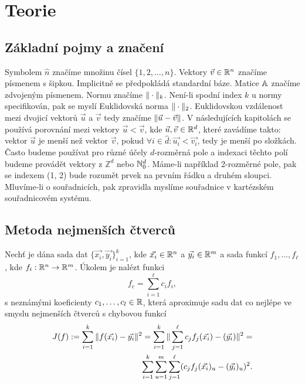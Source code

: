 \chapter{Teorie}

\section{Základní pojmy a značení}

Symbolem $\hat n$ značíme množinu čísel $\{1, 2, \ldots, n\}$. Vektory $\vec{v} \in \mathbb{R}^n$ značíme písmenem s šipkou. Implicitně se předpokládá standardní báze. Matice $\mathbb{A}$ značíme zdvojeným písmenem. Normu značíme $\|\cdot\|_k$. Není-li spodní index $k$ u normy specifikován, pak se myslí Euklidovská norma $\|\cdot\|_2$. Euklidovskou vzdálenost mezi dvojicí vektorů $\vec{u}$ a $\vec{v}$ tedy značíme $\|\vec{u} - \vec{v}\|$. V následujících kapitolách se používá porovnání mezi vektory $\vec{u} < \vec{v}$, kde $\vec{u}, \vec{v} \in \mathbb{R}^d$, které zavádíme takto: vektor $\vec{u}$ je menší než vektor $\vec{v}$, pokud $\forall i \in \hat{d}: \vec{u_i} < \vec{v_i}$, tedy je menší po složkách. Často budeme používat pro různé účely $d$-rozměrná pole a indexaci těchto polí budeme provádět vektory z $\mathbb{Z}^d$ nebo $\mathbb{N}_0^d$. Máme-li například 2-rozměrné pole, pak se indexem (1, 2) bude rozumět prvek na prvním řádku a druhém sloupci. Mluvíme-li o souřadnicích, pak zpravidla myslíme souřadnice v kartézském souřadnicovém systému.

\section{Metoda nejmenších čtverců}

Nechť je dána sada dat $\{\vec{x_i}, \vec{y_i}\}_{i = 1}^k$, kde $\vec{x_i} \in \mathbb{R}^n$ a $\vec{y_i} \in \mathbb{R}^m$ a sada funkcí $f_1,\ldots,f_\ell$, kde $f_i: \mathbb{R}^n \rightarrow \mathbb{R}^m$. Úkolem je nalézt funkci
\[
  f_c = \sum_{i=1}^\ell c_if_i,
\]
s neznámými koeficienty $c_1,\ldots,c_l \in \mathbb{R}$, která aproximuje sadu dat co nejlépe ve smyslu nejmenších čtverců s chybovou funkcí
\begin{align}
  \label{defi:ls-min}
  J(f) := \sum_{i=1}^k \|f(\vec{x_i}) - \vec{y_i}\|^2 =
  \sum_{i=1}^k\|\sum_{j=1}^\ell c_jf_j(\vec{x_i}) - (\vec{y_i})\|^2 =&\notag\\
  \sum_{i=1}^k\sum_{u=1}^m\sum_{j=1}^\ell (c_jf_j(\vec{x_i})_u - (\vec{y_i})_u)^2.
\end{align}

